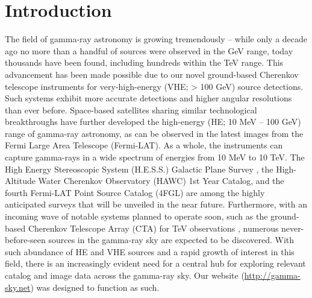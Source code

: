 \section{Introduction}

The field of gamma-ray astronomy is growing tremendously – while only a decade ago no more than a handful of sources were observed in the GeV range, today thousands have been found, including hundreds within the TeV range. This advancement has been made possible due to our novel ground-based Cherenkov telescope instruments for very-high-energy (VHE; > 100 GeV) source detections. Such systems exhibit more accurate detections and higher angular resolutions than ever before. Space-based satellites sharing similar technological breakthroughs have further developed the high-energy (HE; 10 MeV -- 100 GeV) range of gamma-ray astronomy, as can be observed in the latest images from the Fermi Large Area Telescope (Fermi-LAT). As a whole, the instruments can capture gamma-rays in a wide spectrum of energies from 10 MeV to 10 TeV. The High Energy Stereoscopic System (H.E.S.S.) Galactic Plane Survey \cite{hgps}, the High-Altitude Water Cherenkov Observatory (HAWC) 1st Year Catalog, and the fourth Fermi-LAT Point Source Catalog (4FGL) are among the highly anticipated surveys that will be unveiled in the near future. Furthermore, with an incoming wave of notable systems planned to operate soon, such as the ground-based Cherenkov Telescope Array (CTA) for TeV observations \cite{cta}, numerous never-before-seen sources in the gamma-ray sky are expected to be discovered. With such abundance of HE and VHE sources and a rapid growth of interest in this field, there is an increasingly evident need for a central hub for exploring relevant catalog and image data across the gamma-ray sky. Our website (\url{http://gamma-sky.net}) was designed to function as such.
